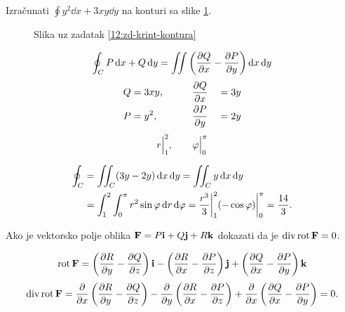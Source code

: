 \begin{zadatak}
\label{12:zd-krint-kontura}
Izračunati $\displaystyle \oint y^2 \dd{x} + 3xy \dd{y}$ na konturi sa slike \ref{12:slika-krint-kontura}.
\end{zadatak}

\begin{center}
	\begin{minipage}[t]{0.48\textwidth}
		\begin{figure}[H]
			\centering
			\caption{Slika uz zadatak \ref{12:zd-krint-kontura}}
			\label{12:slika-krint-kontura}
		\end{figure}	
	\end{minipage}
	\begin{minipage}[t]{0.48\textwidth}
		\[
		\oint_C P\dd{x} + Q\dd{y} = \iint \left( \pdv{Q}{x} - \pdv{P}{y}  \right) \dd{x} \dd{y}
		\] 
		\begin{alignat*}{3}
			Q &= 3xy, \qquad && \pdv{Q}{{x}} &&= 3y \\
			P &= y^2, \qquad && \pdv{P}{{y}} &&= 2y
		\end{alignat*}
		\[
		r\Big|_1^{2}, \qquad \varphi\Big|_0^{\pi}
		\] 
	\end{minipage}
\end{center}

\begin{alignat*}{1}
	\oint_C		&= \iint_C (3y-2y) \dd{x} \dd{y} = \iint_C y \dd{x} \dd{y} \\
	&= \int_{1}^{2} \int_{0}^{\pi} r^2 \sin\varphi \dd{r} \dd{ \varphi } 
	= \frac{r^3}{3} \bigg|_1^{2} (- \cos \varphi) \bigg|_0^{\pi} = \frac{14}{3}
.\end{alignat*}

\begin{zadatak}
Ako je vektorsko polje oblika $\vb{F} = P \vb{i} + Q \vb{j} + R \vb{k}$ dokazati da je $\operatorname{div} \operatorname{rot} \vb{F} = 0$.
\end{zadatak}
\[
\operatorname{rot} \vb{F} = \left( \pdv{R}{{y}} -\pdv{Q}{{z}}  \right) \vb{i} - \left( \pdv{R}{{x}} -\pdv{P}{{z}}  \right) \vb{j} + \left( \pdv{Q}{{x}}  - \pdv{P}{{y}}  \right) \vb{k}
\] 
\[
\operatorname{div} \operatorname{rot} \vb{F} = \pdv{}{{x}} \left(\pdv{R}{{y}} - \pdv{Q}{{z}} \right) - \pdv{}{{y}} \left( \pdv{R}{{x}} -\pdv{P}{{z}}  \right) + \pdv{ }{{x}} \left( \pdv{Q}{{x}} - \pdv{P}{{y}}  \right) = 0 
.\]


